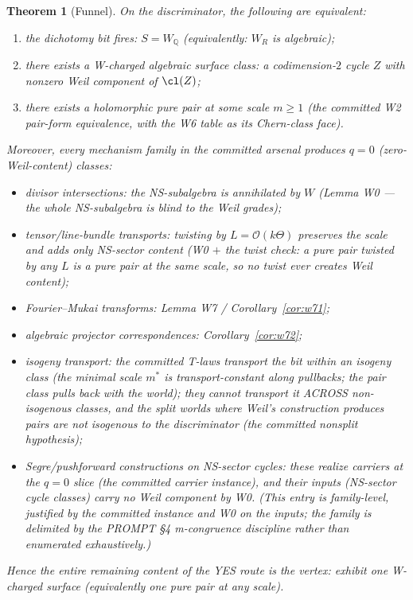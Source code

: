 \documentclass[11pt]{article}
\newtheorem{theorem}{Theorem}[section]
\theoremstyle{definition}
\newcommand{\Q}{\mathbb{Q}}
\begin{document}
\begin{theorem}[Funnel]\label{thm:funnel}
On the discriminator, the following are equivalent:
\begin{enumerate}
\item[(i)] the dichotomy bit fires: $S=W_\Q$ (equivalently: $W_R$ is
algebraic);
\item[(ii)] there exists a W-charged algebraic surface class: a codimension-$2$
cycle $Z$ with nonzero Weil component of $\cl(Z)$;
\item[(iii)] there exists a holomorphic pure pair at some scale $m\ge 1$
(the committed W2 pair-form equivalence, with the W6 table as its
Chern-class face).
\end{enumerate}
Moreover, every mechanism family in the committed arsenal produces $q=0$
(zero-Weil-content) classes:
\begin{itemize}
\item divisor intersections: the NS-subalgebra is annihilated by $W$
(Lemma W0 --- the whole NS-subalgebra is blind to the Weil grades);
\item tensor/line-bundle transports: twisting by $L=\mathcal O(k\Theta)$
preserves the scale and adds only NS-sector content (W0 $+$ the twist check:
a pure pair twisted by any $L$ is a pure pair at the same scale, so no
twist ever creates Weil content);
\item Fourier--Mukai transforms: Lemma W7 / Corollary~\ref{cor:w71};
\item algebraic projector correspondences: Corollary~\ref{cor:w72};
\item isogeny transport: the committed T-laws transport the bit within an
isogeny class (the minimal scale $m^*$ is transport-constant along
pullbacks; the pair class pulls back with the world); they cannot
transport it ACROSS non-isogenous classes, and the split worlds where
Weil's construction produces pairs are not isogenous to the discriminator
(the committed nonsplit hypothesis);
\item Segre/pushforward constructions on NS-sector cycles: these realize
carriers at the $q=0$ slice (the committed carrier instance), and their
inputs (NS-sector cycle classes) carry no Weil component by W0. (This
entry is family-level, justified by the committed instance and W0 on the
inputs; the family is delimited by the PROMPT \S4 m-congruence discipline
rather than enumerated exhaustively.)
\end{itemize}
Hence the entire remaining content of the YES route is the vertex: exhibit
one W-charged surface (equivalently one pure pair at any scale).
\end{theorem}
\end{document}
